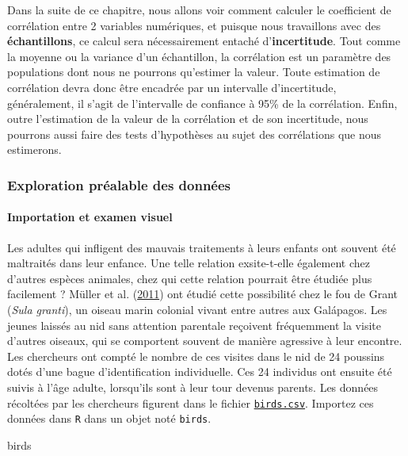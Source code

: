 \documentclass[a4paperpaper,]{article}
\newenvironment{Shaded}{\begin{snugshade}}{\end{snugshade}}
\newcommand{\NormalTok}[1]{\textcolor[rgb]{0.12,0.11,0.11}{#1}}
\let\oldparagraph\paragraph
\renewcommand{\paragraph}[1]{\oldparagraph{#1}\mbox{}}
\begin{document}
Dans la suite de ce chapitre, nous allons voir comment calculer le coefficient de corrélation entre 2 variables numériques, et puisque nous travaillons avec des \textbf{échantillons}, ce calcul sera nécessairement entaché d'\textbf{incertitude}. Tout comme la moyenne ou la variance d'un échantillon, la corrélation est un paramètre des populations dont nous ne pourrons qu'estimer la valeur. Toute estimation de corrélation devra donc être encadrée par un intervalle d'incertitude, généralement, il s'agit de l'intervalle de confiance à 95\% de la corrélation. Enfin, outre l'estimation de la valeur de la corrélation et de son incertitude, nous pourrons aussi faire des tests d'hypothèses au sujet des corrélations que nous estimerons.

\hypertarget{exploration-pruxe9alable-des-donnuxe9es-2}{%
\subsubsection{Exploration préalable des données}\label{exploration-pruxe9alable-des-donnuxe9es-2}}

\hypertarget{importation-et-examen-visuel-4}{%
\paragraph{Importation et examen visuel}\label{importation-et-examen-visuel-4}}

Les adultes qui infligent des mauvais traitements à leurs enfants ont souvent été maltraités dans leur enfance. Une telle relation exsite-t-elle également chez d'autres espèces animales, chez qui cette relation pourrait être étudiée plus facilement ? Müller et al. (\protect\hyperlink{ref-muller2011}{2011}) ont étudié cette possibilité chez le fou de Grant (\emph{Sula granti}), un oiseau marin colonial vivant entre autres aux Galápagos. Les jeunes laissés au nid sans attention parentale reçoivent fréquemment la visite d'autres oiseaux, qui se comportent souvent de manière agressive à leur encontre. Les chercheurs ont compté le nombre de ces visites dans le nid de 24 poussins dotés d'une bague d'identification individuelle. Ces 24 individus ont ensuite été suivis à l'âge adulte, lorsqu'ils sont à leur tour devenus parents. Les données récoltées par les chercheurs figurent dans le fichier \href{https://besibo.github.io/Biometrie3/data/birds.csv}{\texttt{birds.csv}}. Importez ces données dans \texttt{R} dans un objet noté \texttt{birds}.

\begin{Shaded}
\begin{Highlighting}[]
\NormalTok{birds}
\end{Highlighting}
\end{Shaded}
\end{document}
